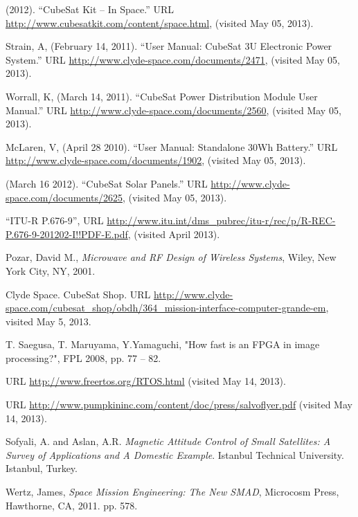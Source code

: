 \documentclass[12pt]{article}
\begin{document}
\begin{thebibliography}{9}
 (2012).  ``CubeSat Kit -- In Space.''  URL \url{http://www.cubesatkit.com/content/space.html}, (visited May 05, 2013).

 Strain, A, (February 14, 2011).  ``User Manual: CubeSat 3U Electronic Power System.'' URL \url{http://www.clyde-space.com/documents/2471}, (visited May 05, 2013).

 Worrall, K, (March 14, 2011).  ``CubeSat Power Distribution Module User Manual.'' URL \url{http://www.clyde-space.com/documents/2560}, (visited May 05, 2013).

 McLaren, V, (April 28 2010).  ``User Manual: Standalone 30Wh Battery.''  URL \url{http://www.clyde-space.com/documents/1902}, (visited May 05, 2013).

 (March 16 2012). ``CubeSat Solar Panels.''  URL \url{http://www.clyde-space.com/documents/2625}, (visited May 05, 2013).


``ITU-R P.676-9'', URL \url{http://www.itu.int/dms_pubrec/itu-r/rec/p/R-REC-P.676-9-201202-I!!PDF-E.pdf}, (visited April 2013).

Pozar, David M., \emph{Microwave and RF Design of Wireless Systems}, Wiley, New York City, NY, 2001.



Clyde Space. CubeSat Shop. URL \url{http://www.clyde-space.com/cubesat_shop/obdh/364_mission-interface-computer-grande-em}, visited May 5, 2013. 

T. Saegusa, T. Maruyama, Y.Yamaguchi, "How fast is an FPGA in image processing?", FPL 2008, pp. 77 – 82.

URL \url{http://www.freertos.org/RTOS.html} (visited May 14, 2013).

URL \url{http://www.pumpkininc.com/content/doc/press/salvoflyer.pdf} (visited May 14, 2013).


Sofyali, A. and Aslan, A.R. \emph{Magnetic Attitude Control of Small Satellites: A Survey of Applications and A Domestic Example}. Istanbul Technical University. Istanbul, Turkey. 

Wertz, James, \emph{Space Mission Engineering: The New SMAD}, Microcosm Press, Hawthorne, CA, 2011. pp. 578. 


\end{thebibliography}
\end{document}

